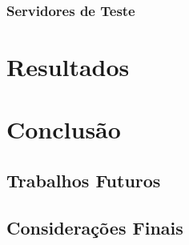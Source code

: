 \documentclass[
	12pt,               %
	openright,          %
	twoside,            %
	a4paper,            %
	english,            %
	brazil              %
	]{abntex2}
\begin{document}
\subsection{Servidores de Teste}

\chapter{Resultados}

\chapter{Conclusão}

\section{Trabalhos Futuros}

\section{Considerações Finais}



\postextual



%
%




\end{document}

